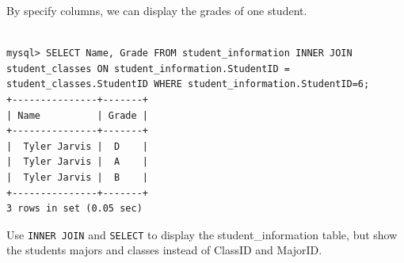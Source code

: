 By specify columns, we can display the grades of one student.

\begin{lstlisting}

mysql> SELECT Name, Grade FROM student_information INNER JOIN student_classes ON student_information.StudentID = student_classes.StudentID WHERE student_information.StudentID=6;
+---------------+-------+
| Name          | Grade |
+---------------+-------+
|  Tyler Jarvis |  D    |
|  Tyler Jarvis |  A    |
|  Tyler Jarvis |  B    |
+---------------+-------+
3 rows in set (0.05 sec)

\end{lstlisting}

\begin{problem}

Use {\tt INNER JOIN} and {\tt SELECT} to display the student\_information table, but show the students majors and classes instead of ClassID and MajorID.

\end{problem}

\let\undefined\lsql
